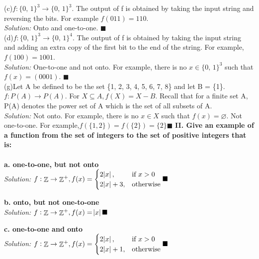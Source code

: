 \documentclass[11pt]{article}
\DeclareMathOperator*{\Z}{\mathbb{Z}}\relax
\begin{document}
		(c)$f: \{0, \, 1\}^3 \rightarrow \{0, \, 1\}^3$. The output of f is obtained by taking the input string and reversing the bits. For example $f(011) = 110$.\\
		\textit{Solution: }
		Onto and one-to-one. $\blacksquare$ \\
		
		(d)$f: \{0, \, 1\}^3 \rightarrow \{0, \, 1\}^4$. The output of f is obtained by taking the input string and adding an extra copy of the first bit to the end of the string. 
		For example, $f(100) = 1001$. \\
		\textit{Solution: }
		One-to-one and not onto. For example, there is no $x \in  \{0, \, 1\}^3$ such that $f(x) = (0001)$. $\blacksquare$ \\
		
		(g)Let A be defined to be the set \{1, 2, 3, 4, 5, 6, 7, 8\} and let B = \{1\}.
		$f: P(A) \rightarrow P(A)$. For $X \subseteq A, f(X) = X - B$. 
		Recall that for a finite set A, P(A) denotes the power set of A which is the set of all subsets of A. \\
		\textit{Solution: }
		Not onto. For example, there is no $x \in  X$ such that $f(x) = \varnothing$. 
		Not one-to-one. For example,$f(\{1, 2\}) = f(\{2\}) = \{2\}\blacksquare$ 
	\newpage
	\textbf{II. Give an example of a function from the set of integers to the set of positive integers that is:}\\
	\\	
		\textbf{a. one-to-one, but not onto} \\
		\textit{Solution: }
		$f: \Z \rightarrow \Z^+, f(x) = 
							\begin{cases}
   								 2\abs{x} , & \text{if } x > 0\\
    								2\abs{x}  + 3,              & \text{otherwise}
							\end{cases} \blacksquare$		
		
		\textbf{b. onto, but not one-to-one} \\
		\textit{Solution: }
		$f: \Z \rightarrow \Z^+, f(x) = \abs{x} \blacksquare$
		
		\textbf{c. one-to-one and onto} \\
		\textit{Solution: }
		$f: \Z \rightarrow \Z^+, f(x) = 
							\begin{cases}
   								 2\abs{x} , & \text{if } x > 0\\
    								2\abs{x}  + 1,              & \text{otherwise}
							\end{cases} \blacksquare$ \\	
		
\end{document}
